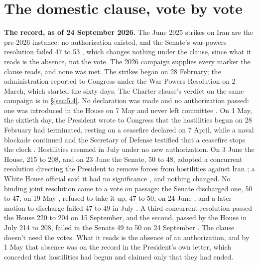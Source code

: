 \section{The domestic clause, vote by vote}
\label{sec:G.6}
\textbf{The record, as of 24 September 2026.} The June 2025 strikes on Iran are the pre-2026 instance: no authorization existed, and the Senate's war-powers resolution failed 47 to 53 \autocite{senate2025kaine}, which changes nothing under the clause, since what it reads is the absence, not the vote. The 2026 campaign supplies every marker the clause reads, and none was met. The strikes began on 28 February; the administration reported to Congress under the War Powers Resolution on 2 March, which started the sixty days. The Charter clause's verdict on the same campaign is in \S\ref{sec:5.4}. No declaration was made and no authorization passed: one was introduced in the House on 7 May and never left committee \autocite{hjres176}. On 1 May, the sixtieth day, the President wrote to Congress that the hostilities begun on 28 February had terminated, resting on a ceasefire declared on 7 April, while a naval blockade continued and the Secretary of Defense testified that a ceasefire stops the clock \autocite{cbs2026terminated,lawfare2026sixtydays}. Hostilities resumed in July under no new authorization. On 3 June the House, 215 to 208, and on 23 June the Senate, 50 to 48, adopted a concurrent resolution directing the President to remove forces from hostilities against Iran \autocite{hconres86,npr2026housejune,asil2026iranwpr}; a White House official said it had no significance \autocite{abc2026nosignificance}, and nothing changed. No binding joint resolution came to a vote on passage: the Senate discharged one, 50 to 47, on 19 May \autocite{cbs2026sjres185discharge,lawfare2026resolutions}, refused to take it up, 47 to 50, on 24 June \autocite{senate2026rollcall192}, and a later motion to discharge failed 47 to 49 in July \autocite{thehill2026discharge}. A third concurrent resolution passed the House 220 to 204 on 15 September, and the second, passed by the House in July 214 to 208, failed in the Senate 49 to 50 on 24 September \autocite{npr2026senatesept}. The clause doesn't need the votes. What it reads is the absence of an authorization, and by 1 May that absence was on the record in the President's own letter, which conceded that hostilities had begun and claimed only that they had ended.
